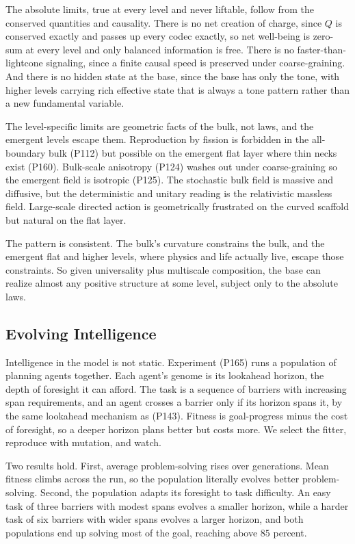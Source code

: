 The absolute limits, true at every level and never liftable, follow from the conserved quantities and causality. There is no net creation of charge, since $Q$ is conserved exactly and passes up every codec exactly, so net well-being is zero-sum at every level and only balanced information is free. There is no faster-than-lightcone signaling, since a finite causal speed is preserved under coarse-graining. And there is no hidden state at the base, since the base has only the tone, with higher levels carrying rich effective state that is always a tone pattern rather than a new fundamental variable.

The level-specific limits are geometric facts of the bulk, not laws, and the emergent levels escape them. Reproduction by fission is forbidden in the all-boundary bulk (P112) but possible on the emergent flat layer where thin necks exist (P160). Bulk-scale anisotropy (P124) washes out under coarse-graining so the emergent field is isotropic (P125). The stochastic bulk field is massive and diffusive, but the deterministic and unitary reading is the relativistic massless field. Large-scale directed action is geometrically frustrated on the curved scaffold but natural on the flat layer.

The pattern is consistent. The bulk's curvature constrains the bulk, and the emergent flat and higher levels, where physics and life actually live, escape those constraints. So given universality plus multiscale composition, the base can realize almost any positive structure at some level, subject only to the absolute laws.

\subsection{Evolving Intelligence}

Intelligence in the model is not static. Experiment (P165) runs a population of planning agents together. Each agent's genome is its lookahead horizon, the depth of foresight it can afford. The task is a sequence of barriers with increasing span requirements, and an agent crosses a barrier only if its horizon spans it, by the same lookahead mechanism as (P143). Fitness is goal-progress minus the cost of foresight, so a deeper horizon plans better but costs more. We select the fitter, reproduce with mutation, and watch.

Two results hold. First, average problem-solving rises over generations. Mean fitness climbs across the run, so the population literally evolves better problem-solving. Second, the population adapts its foresight to task difficulty. An easy task of three barriers with modest spans evolves a smaller horizon, while a harder task of six barriers with wider spans evolves a larger horizon, and both populations end up solving most of the goal, reaching above $85$ percent.

